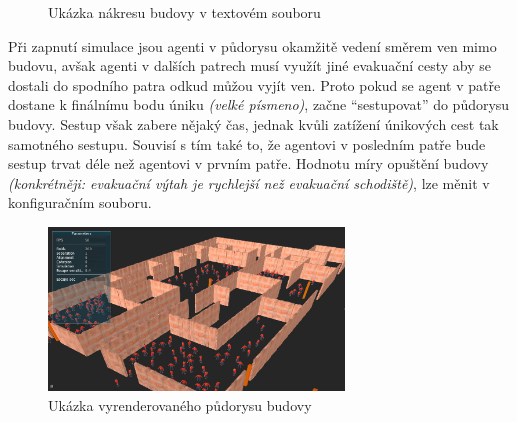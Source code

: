 \documentclass[czech,public,dept460,male,cpdeclaration]{diploma}
\begin{document}
\begin{figure}[H]
	\centering
	\hfill
	\caption{Ukázka nákresu budovy v textovém souboru} \label{fig:mapatxt}
\end{figure}

Při zapnutí simulace jsou agenti v půdorysu okamžitě vedení směrem ven mimo budovu, avšak agenti v dalších patrech musí využít jiné evakuační cesty aby se dostali do spodního patra odkud můžou vyjít ven. Proto pokud se agent v patře dostane k finálnímu bodu úniku \textit{(velké písmeno)}, začne ``sestupovat'' do půdorysu budovy. Sestup však zabere nějaký čas, jednak kvůli zatížení únikových cest tak samotného sestupu. Souvisí s tím také to, že agentovi v posledním patře bude sestup trvat déle než agentovi v prvním patře. Hodnotu míry opuštění budovy \textit{(konkrétněji: evakuační výtah je rychlejší než evakuační schodiště)}, lze měnit v konfiguračním souboru.

\begin{figure}[H]\centering\includegraphics[width=0.7\textwidth]{Figures/screen5.jpg}
	\caption{Ukázka vyrenderovaného půdorysu budovy}
\end{figure}
\end{document}
